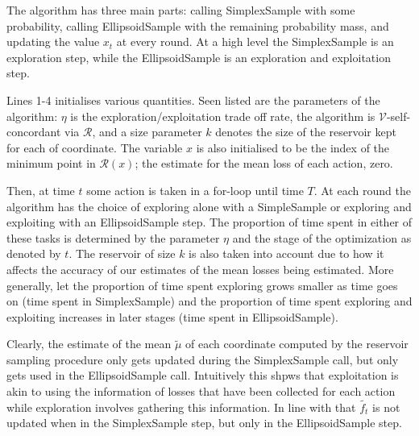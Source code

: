 The algorithm has three main parts: calling SimplexSample with some probability, calling EllipsoidSample with the remaining probability mass, and updating the value $x_t$ at every round. At a high level the SimplexSample is an exploration step, while the EllipsoidSample is an exploration and exploitation step.

Lines 1-4 initialises various quantities. Seen listed are the parameters of the algorithm: $\eta$ is the exploration/exploitation trade off rate, the algorithm is $\mathcal{V}$-self-concordant via $\mathcal{R}$, and a size parameter $k$ denotes the size of the reservoir kept for each of coordinate. The variable $x$ is also initialised to be the index of the minimum point in $\mathcal{R}(x)$; the estimate for the mean loss of each action, zero.

Then, at time $t$ some action is taken in a for-loop until time $T$. At each round the algorithm has the choice of exploring alone with a SimpleSample or exploring and exploiting with an EllipsoidSample step. The proportion of time spent in either of these tasks is determined by the parameter $\eta$ and the stage of the optimization as denoted by $t$. The reservoir of size $k$ is also taken into account due to how it affects the accuracy of our estimates of the mean losses being estimated. More generally, let the proportion of time spent exploring grows smaller as time goes on (time spent in SimplexSample) and the proportion of time spent exploring and exploiting increases in later stages (time spent in EllipsoidSample).

Clearly, the estimate of the mean $\tilde{\mu}$ of each coordinate computed by the reservoir sampling procedure only gets updated during the SimplexSample call, but only gets used in the EllipsoidSample call. Intuitively this shpws that exploitation is akin to using the information of losses that have been collected for each action while exploration involves gathering this information. In line with that $\tilde{f_t}$ is not updated when in the SimplexSample step, but only in the EllipsoidSample step. 


\unskip

\unskip

\unskip


